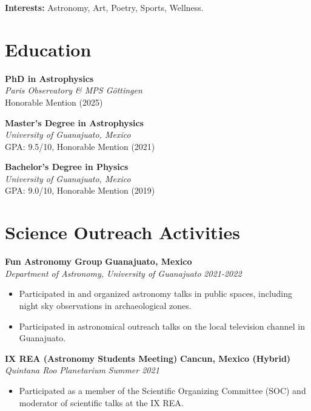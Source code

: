 \documentclass[10pt,a4paper]{article}
\begin{document}
\textbf{Interests:} Astronomy, Art, Poetry, Sports, Wellness.

\section*{Education}

\textbf{PhD in Astrophysics} \\
\textit{Paris Observatory \& MPS Göttingen} \\
Honorable Mention (2025)

\vspace{0.5em}

\textbf{Master's Degree in Astrophysics} \\
\textit{University of Guanajuato, Mexico} \\
GPA: 9.5/10, Honorable Mention (2021)

\vspace{0.5em}

\textbf{Bachelor's Degree in Physics} \\
\textit{University of Guanajuato, Mexico} \\
GPA: 9.0/10, Honorable Mention (2019)

\section*{Science Outreach Activities}
\textbf{Fun Astronomy Group} \hfill \textbf{Guanajuato, Mexico}\\
\textit{Department of Astronomy, University of Guanajuato} \hfill \textit{2021-2022}
\begin{itemize}
\item Participated in and organized astronomy talks in public spaces, including night sky observations in archaeological zones.
\item Participated in astronomical outreach talks on the local television channel in Guanajuato.
\end{itemize}

\textbf{IX REA (Astronomy Students Meeting)} \hfill \textbf{Cancun, Mexico (Hybrid)}\\
\textit{Quintana Roo Planetarium} \hfill \textit{Summer 2021}

\begin{itemize}
\item Participated as a member of the Scientific Organizing Committee (SOC) and moderator of scientific talks at the IX REA.
\end{itemize}
\end{document}
